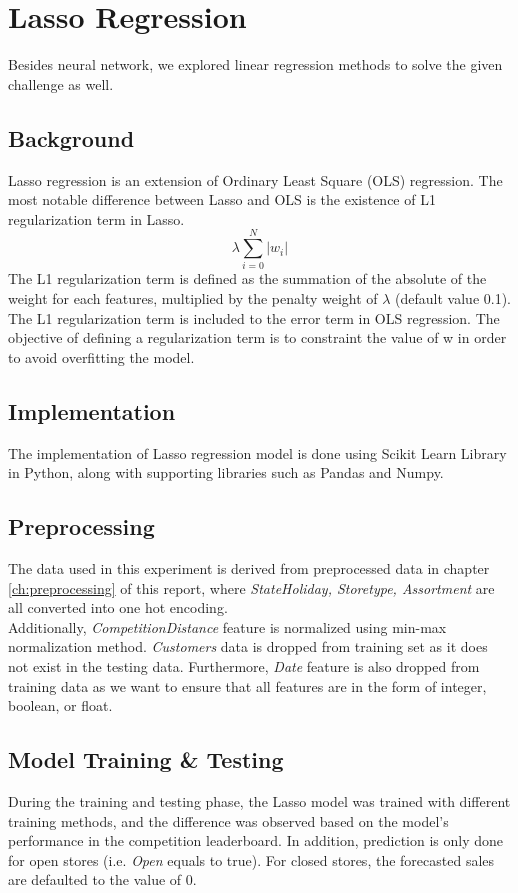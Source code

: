 \section{Lasso Regression} \label{sec:lasso}
Besides neural network, we explored linear regression methods to solve the given challenge as well.

\subsection{Background}
Lasso regression is an extension of Ordinary Least Square (OLS) regression. The most notable difference between Lasso and OLS is the existence of L1 regularization term in Lasso.
\begin{equation}
\label{eq:l1_regularization}
\lambda \sum_{i=0}^{N} |w_i|
\end{equation}
The L1 regularization term is defined as the summation of the absolute of the weight for each features, multiplied by the penalty weight of $\lambda$ (default value 0.1). The L1 regularization term is included to the error term in OLS regression. The objective of defining a regularization term is to constraint the value of w in order to avoid overfitting the model.

\subsection{Implementation}
The implementation of Lasso regression model is done using Scikit Learn Library in Python, along with supporting libraries such as Pandas and Numpy.

\subsection{Preprocessing}
The data used in this experiment is derived from preprocessed data in chapter \ref{ch:preprocessing} of this report, where \textit{StateHoliday, Storetype, Assortment} are all converted into one hot encoding.\\
Additionally, \textit{CompetitionDistance} feature is normalized using min-max normalization method. \textit{Customers} data is dropped from training set as it does not exist in the testing data. Furthermore, \textit{Date} feature is also dropped from training data as we want to ensure that all features are in the form of integer, boolean, or float.

\subsection{Model Training \& Testing}
During the training and testing phase, the Lasso model was trained with different training methods, and the difference was observed based on the model's performance in the competition leaderboard. In addition, prediction is only done for open stores (i.e. \textit{Open} equals to true). For closed stores, the forecasted sales are defaulted to the value of 0.

